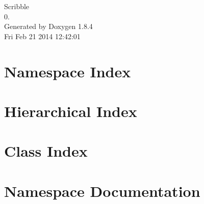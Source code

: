 \documentclass[twoside]{book}
\newcommand{\clearemptydoublepage}{%
  \newpage{\pagestyle{empty}\cleardoublepage}%
}
\begin{document}
\hypersetup{pageanchor=false}
\begin{titlepage}
\vspace*{7cm}
\begin{center}%
{\Large Scribble \\[1ex]\large 0. }\\
\vspace*{1cm}
{\large Generated by Doxygen 1.8.4}\\
\vspace*{0.5cm}
{\small Fri Feb 21 2014 12:42:01}\\
\end{center}
\end{titlepage}
\clearemptydoublepage
\tableofcontents
\clearemptydoublepage
{}
\hypersetup{pageanchor=true}

\chapter{Namespace Index}

\chapter{Hierarchical Index}

\chapter{Class Index}

\chapter{Namespace Documentation}

\end{document}
